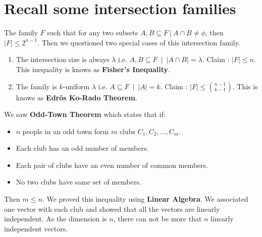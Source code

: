 \section{Recall some intersection families}
The family $F$ such that for any two subsets $A,B\subseteq F ~|~ A\cap B \neq \phi$, then $|F| \le 2^{n-1}$. Then we questioned two special cases of this intersection family.
\begin{enumerate}
    \item The intersection size is always $\lambda$ i.e. $A,B \subseteq F ~ \mid ~ |A \cap B|=\lambda$. Claim : $\boxed{|F|\le n}$. This inequality is knows as \textbf{Fisher's Inequality}.
    \item The family is $k$-uniform $\lambda$ i.e. $A \subseteq F ~ \mid ~ |A|=k$. Claim : $\boxed{|F|\le {{n-1}\choose{k-1}}}$. This is knows as \textbf{Edr{\"o}s Ko-Rado Theorem}.
\end{enumerate}
We saw \textbf{Odd-Town Theorem} which states that if:
\begin{itemize}
    \item $n$ people in an odd town form $m$ clubs $C_1, C_2, \hdots, C_m$.
    \item Each club has an odd number of members.
    \item Each pair of clubs have an even number of common members.
    \item No two clubs have same set of members.
\end{itemize}
Then $m\le n$. We proved this inequality using \textbf{Linear Algebra}. We associated one vector with each club and showed that all the vectors are linearly independent. As the dimension is $n$, there can not be more that $n$ linearly independent vectors.

